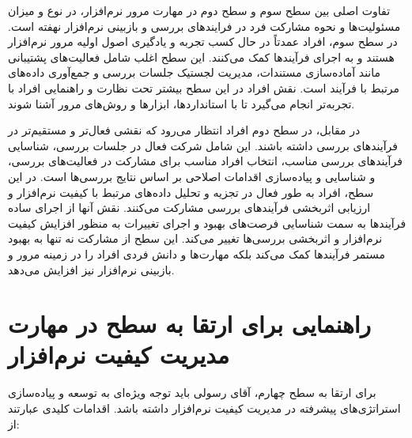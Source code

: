 تفاوت اصلی بین سطح سوم
و سطح دوم
در مهارت مرور نرم‌افزار، در نوع و میزان مسئولیت‌ها و نحوه مشارکت فرد در فرایندهای بررسی و بازبینی نرم‌افزار نهفته است. در سطح سوم، افراد عمدتاً در حال کسب تجربه و یادگیری اصول اولیه مرور نرم‌افزار هستند و به اجرای فرآیندها کمک می‌کنند. این سطح اغلب شامل فعالیت‌های پشتیبانی مانند آماده‌سازی مستندات، مدیریت لجستیک جلسات بررسی و جمع‌آوری داده‌های مرتبط با فرآیند است. نقش افراد در این سطح بیشتر تحت نظارت و راهنمایی افراد با تجربه‌تر انجام می‌گیرد تا با استانداردها، ابزارها و روش‌های مرور آشنا شوند.

در مقابل، در سطح دوم 
افراد انتظار می‌رود که نقشی فعال‌تر و مستقیم‌تر در فرآیندهای بررسی داشته باشند. این شامل شرکت فعال در جلسات بررسی، شناسایی فرآیندهای بررسی مناسب، انتخاب افراد مناسب برای مشارکت در فعالیت‌های بررسی، و شناسایی و پیاده‌سازی اقدامات اصلاحی بر اساس نتایج بررسی‌ها است. در این سطح، افراد به طور فعال در تجزیه و تحلیل داده‌های مرتبط با کیفیت نرم‌افزار و ارزیابی اثربخشی فرآیندهای بررسی مشارکت می‌کنند. نقش آنها از اجرای ساده فرآیندها به سمت شناسایی فرصت‌های بهبود و اجرای تغییرات به منظور افزایش کیفیت نرم‌افزار و اثربخشی بررسی‌ها تغییر می‌کند. این سطح از مشارکت نه تنها به بهبود مستمر فرآیندها کمک می‌کند بلکه مهارت‌ها و دانش فردی افراد را در زمینه مرور و بازبینی نرم‌افزار نیز افزایش می‌دهد.

\section*{راهنمایی برای ارتقا به سطح  در مهارت مدیریت کیفیت نرم‌افزار}

برای ارتقا به سطح چهارم، آقای رسولی باید توجه ویژه‌ای به توسعه و پیاده‌سازی استراتژی‌های پیشرفته در مدیریت کیفیت نرم‌افزار داشته باشد. اقدامات کلیدی عبارتند از:

